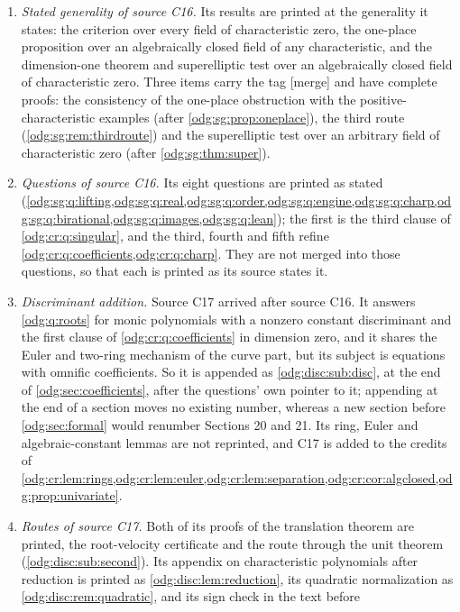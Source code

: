 \documentclass[11pt,oneside]{article}
\numberwithin{equation}{section}
\theoremstyle{definition}
\theoremstyle{remark}
\newcommand{\mergetag}{\textup{\textsf{\small[merge]}}}
\begin{document}
\begin{enumerate}[leftmargin=*]
(\cref{odg:sg:thm:example}); its B\'ezout polynomials are those of \eqref{odg:cr:eq:cubic}.
\item \emph{Stated generality of source C16.} Its results are printed at the generality it
states: the criterion over every field of characteristic zero, the one-place proposition
over an algebraically closed field of any characteristic, and the dimension-one theorem and
superelliptic test over an algebraically closed field of characteristic zero. Three items
carry the tag \mergetag{} and have complete proofs: the consistency of the one-place
obstruction with the positive-characteristic examples (after \cref{odg:sg:prop:oneplace}),
the third route (\cref{odg:sg:rem:thirdroute}) and the superelliptic test over an arbitrary
field of characteristic zero (after \cref{odg:sg:thm:super}).
\item \emph{Questions of source C16.} Its eight questions are printed as stated
(\cref{odg:sg:q:lifting,odg:sg:q:real,odg:sg:q:order,odg:sg:q:engine,odg:sg:q:charp,odg:sg:q:birational,odg:sg:q:images,odg:sg:q:lean});
the first is the third clause of \cref{odg:cr:q:singular}, and the third, fourth and fifth
refine \cref{odg:cr:q:coefficients,odg:cr:q:charp}. They are not merged into those questions,
so that each is printed as its source states it.
\item \emph{Discriminant addition.} Source C17 arrived after source C16. It answers
\cref{odg:q:roots} for monic polynomials with a nonzero constant discriminant and the first
clause of \cref{odg:cr:q:coefficients} in dimension zero, and it shares the Euler and
two-ring mechanism of the curve part, but its subject is equations with omnific
coefficients. So it is appended as \cref{odg:disc:sub:disc}, at the end of
\cref{odg:sec:coefficients}, after the questions' own pointer to it; appending at the end of
a section moves no existing number, whereas a new section before \cref{odg:sec:formal}
would renumber Sections 20 and 21. Its ring, Euler and algebraic-constant lemmas are not
reprinted, and C17 is added to the credits of
\cref{odg:cr:lem:rings,odg:cr:lem:euler,odg:cr:lem:separation,odg:cr:cor:algclosed,odg:prop:univariate}.
\item \emph{Routes of source C17.} Both of its proofs of the translation theorem are printed,
the root-velocity certificate and the route through the unit theorem
(\cref{odg:disc:sub:second}). Its appendix on characteristic polynomials after reduction is
printed as \cref{odg:disc:lem:reduction}, its quadratic normalization as
\cref{odg:disc:rem:quadratic}, and its sign check in the text before

\end{enumerate}
\end{document}
